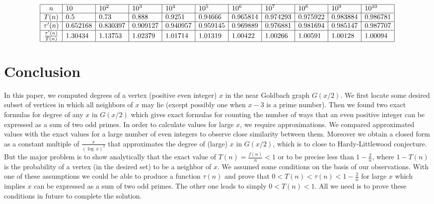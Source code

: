 \documentclass[11pt]{article}
\theoremstyle{definition}
\theoremstyle{remark}
\numberwithin{equation}{section}
\begin{document}
\begin{table}[ht]
{\footnotesize $$\begin{array}{|c|l|l|l|l|l|l|l|l|l|l|}
\hline
n & 10 & 10^2 & 10^3 & 10^4 & 10^5 & 10^6 & 10^7 & 10^8 & 10^9 & 10^{10}\\
\hline
T(n) & 0.5 & 0.73 & 0.888 & 0.9251 & 0.94666 & 0.965814 & 0.974293 & 0.975922 & 0.983884 & 0.986781\\
\hline
\tau^\prime (n) & 0.652168 & 0.830397 & 0.909127 & 0.940957 & 0.959145 & 0.969889 & 0.976881 & 0.981694 & 0.985147 & 0.987707\\
\hline
\frac{\tau^\prime (n)}{T(n)} & 1.30434 & 1.13753 & 1.02379 & 1.01714 & 1.01319 & 1.00422 & 1.00266 & 1.00591 & 1.00128 & 1.00094 \\
\hline
\end{array}$$}
\caption{Comparison table for $T(n)$ and $\tau^\prime (n)$ for $x=12n+4$.}\label{newubound}
\end{table}

\section{Conclusion}

In this paper, we computed degrees of a vertex (positive even integer) $x$ in the near Goldbach graph $G(x/2)$. We first locate some desired subset of vertices in which all neighbors of $x$ may lie (except possibly one when $x-3$ is a prime number). Then we found two exact formulas for degree of any $x$ in $G(x/2)$ which gives exact formulas for counting the number of ways that an even positive integer can be expressed as a sum of two odd primes. In order to calculate values for large $x$, we require approximations. We compared approximated values with the exact values for a large number of even integers to observe close similarity between them. Moreover we obtain a closed form as a constant multiple of $\frac{x}{(\log\, x)^2}$ that approximates the degree of (large) $x$ in $G(x/2)$, which is to close to Hardy-Littlewood conjecture. But the major problem is to show analytically that the exact value of $T(n)=\frac{f(n)}{n}<1$ or to be precise less than $1-\frac{2}{n}$, where $1-T(n)$ is the probability of a vertex (in the desired set) to be a neighbor of $x$. We assumed some conditions on the basis of our observations. With one of these assumptions we could be able to produce a function $\tau(n)$ and prove that $0<T(n)<\tau(n)<1-\frac{2}{n}$ for large $x$ which implies $x$ can be expressed as a sum of two odd primes. The other one leads to simply $0<T(n)<1$. All we need is to prove these conditions in future to complete the solution.
\end{document}
